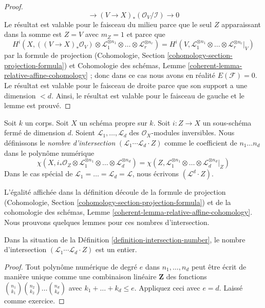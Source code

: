 \begin{proof}
$$\to (V \to X)_*(\mathcal{O}_V/\mathcal{I}) \to 0
$$
Le résultat est valable pour le faisceau du
milieu parce que le seul $Z$ apparaissant dans
la somme est $Z = V$ avec $m_Z = 1$ et parce que
$$
H^i(X, ((V \to X)_*\mathcal{O}_V) \otimes 
 \mathcal{L}_1^{\otimes n_1} \otimes \ldots \otimes
\mathcal{L}_r^{\otimes n_r}) =
H^i(V,  \mathcal{L}_1^{\otimes n_1} \otimes \ldots \otimes
\mathcal{L}_r^{\otimes n_r}|_V)
$$
par la formule de projection (Cohomologie, Section
\ref{cohomology-section-projection-formula}) et
Cohomologie des schémas, Lemme
\ref{coherent-lemma-relative-affine-cohomology} ; donc
dans ce cas nous avons en réalité $E(\mathcal{F}) = 0$. Le
résultat est valable pour le faisceau de droite parce que
son support a une dimension $< d$. Ainsi, le résultat est
valable pour le faisceau de gauche et le lemme est prouvé.
\end{proof}

\begin{definition}
\label{definition-intersection-number}
Soit $k$ un corps. Soit $X$ un schéma propre sur $k$. Soit
$i : Z \to X$ un sous-schéma fermé de dimension $d$. Soient
$\mathcal{L}_1, \ldots, \mathcal{L}_d$ des
$\mathcal{O}_X$-modules inversibles. Nous définissons le {\it
nombre d'intersection } $(\mathcal{L}_1 \cdots \mathcal{L}_d \cdot
Z)$ comme le coefficient de $n_1 \ldots n_d$ dans le polynôme numérique
$$
\chi(X, i_*\mathcal{O}_Z \otimes \mathcal{L}_1^{\otimes n_1} \otimes
\ldots \otimes \mathcal{L}_d^{\otimes n_d}) =
\chi(Z, \mathcal{L}_1^{\otimes n_1} \otimes
\ldots \otimes \mathcal{L}_d^{\otimes n_d}|_Z)
$$
Dans le cas spécial de $\mathcal{L}_1 =
\ldots = \mathcal{L}_d = \mathcal{L}$,
nous écrivons $(\mathcal{L}^d \cdot Z)$.
\end{definition}

\noindent
L'égalité affichée dans la définition découle de
la formule de projection (Cohomologie, Section
\ref{cohomology-section-projection-formula}) et
de la cohomologie des schémas, Lemme
\ref{coherent-lemma-relative-affine-cohomology}. Nous
prouvons quelques lemmes pour ces nombres d'intersection.

\begin{lemma}
\label{lemma-intersection-number-integer}
Dans la situation de la Définition
\ref{definition-intersection-number}, le
nombre d'intersection $(\mathcal{L}_1
\cdots \mathcal{L}_d \cdot Z)$ est un entier.
\end{lemma}

\begin{proof}
Tout polynôme numérique de degré $e$ dans $n_1, \ldots, n_d$
peut être écrit de manière unique comme une combinaison
linéaire $\mathbf{Z}$ des fonctions ${n_1 \choose k_1}{n_2
\choose k_2} \ldots {n_d \choose k_d}$ avec $k_1 + \ldots +
k_d \leq e$. Appliquez ceci avec $e = d$. Laissé comme exercice.
\end{proof}

